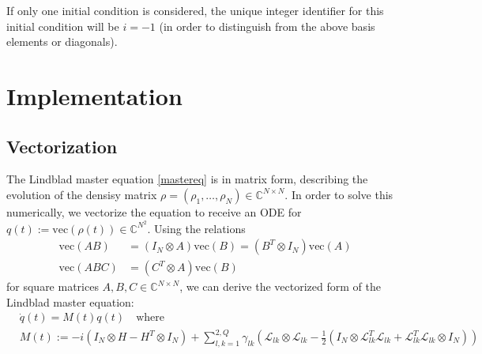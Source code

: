 \documentclass[letterpaper]{article}
\DeclareMathOperator{\Tr}{Tr}
\newcommand{\Ell}{\mathcal{L}}
\newcommand{\C}{\mathds{C}}
\begin{document}
If only one initial condition is considered, the unique integer identifier for
this initial condition will be $i=-1$ (in order to distinguish from the above
basis elements or diagonals).


\section{Implementation}

  \subsection{Vectorization}
  The Lindblad master equation \eqref{mastereq} is in matrix form, describing
  the evolution of the densisy matrix $\rho = (\rho_1, \dots, \rho_N) \in
  \C^{N\times N}$. In order to solve this numerically, we vectorize the equation
  to receive an ODE for $q(t) := \text{vec}(\rho(t)) \in \C^{N^2}$. Using the
  relations
  \begin{align}
   \text{vec}(AB) &= (I_N\otimes A)\text{vec}(B) = (B^T\otimes I_N)\text{vec}(A)
    \\
   \text{vec}(ABC) &= (C^T\otimes A)\text{vec}(B)
  \end{align}
  for square matrices $A,B,C\in\C^{N\times N}$, we can derive the vectorized
  form of the Lindblad master equation:
  \begin{align}\label{mastereq_vectorized}
    &\dot q(t) = M(t) q(t) \quad  \text{where} \\
    &M(t) := -i(I_N\otimes H - H^T \otimes I_N) + \sum_{l,k=1}^{2,Q} \gamma_{lk}
    \left( \Ell_{lk}\otimes \Ell_{lk} - \frac 1 2 \left( I_N\otimes
    \Ell^T_{lk}\Ell_{lk} + \Ell^T_{lk}\Ell_{lk} \otimes I_N \right) \right)
  \end{align}
\end{document}
